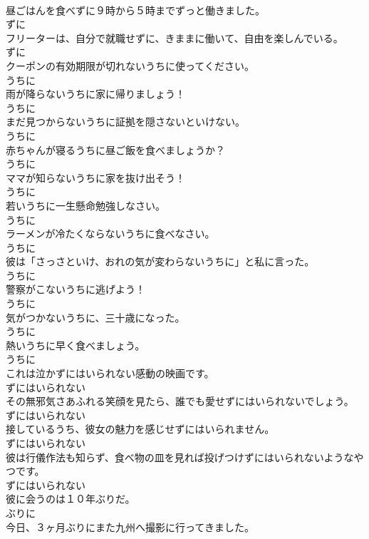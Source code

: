 \documentclass[8pt]{extreport}
\begin{document}
\begin{CJK}{UTF8}{min}
\\	昼ごはんを食べずに９時から５時までずっと働きました。	
\\	ずに
\\	フリーターは、自分で就職せずに、きままに働いて、自由を楽しんでいる。	
\\	ずに
\\	クーポンの有効期限が切れないうちに使ってください。	
\\	うちに
\\	雨が降らないうちに家に帰りましょう！	
\\	うちに
\\	まだ見つからないうちに証拠を隠さないといけない。	
\\	うちに
\\	赤ちゃんが寝るうちに昼ご飯を食べましょうか？	
\\	うちに
\\	ママが知らないうちに家を抜け出そう！	
\\	うちに
\\	若いうちに一生懸命勉強しなさい。	
\\	うちに
\\	ラーメンが冷たくならないうちに食べなさい。	
\\	うちに
\\	彼は「さっさといけ、おれの気が変わらないうちに」と私に言った。	
\\	うちに
\\	警察がこないうちに逃げよう！	
\\	うちに
\\	気がつかないうちに、三十歳になった。	
\\	うちに
\\	熱いうちに早く食べましょう。	
\\	うちに
\\	これは泣かずにはいられない感動の映画です。	
\\	ずにはいられない
\\	その無邪気さあふれる笑顔を見たら、誰でも愛せずにはいられないでしょう。	
\\	ずにはいられない
\\	接しているうち、彼女の魅力を感じせずにはいられません。	
\\	ずにはいられない
\\	彼は行儀作法も知らず、食べ物の皿を見れば投げつけずにはいられないようなやつです。	
\\	ずにはいられない
\\	彼に会うのは１０年ぶりだ。	
\\	ぶりに
\\	今日、３ヶ月ぶりにまた九州へ撮影に行ってきました。	

\end{CJK}
\end{document}
